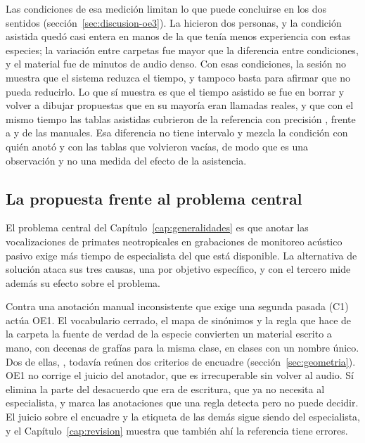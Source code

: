 Las condiciones de esa medición limitan lo que puede concluirse en los dos
sentidos (sección~\ref{sec:discusion-oe3}). La hicieron dos personas, y la
condición asistida quedó casi entera en manos de la que tenía menos experiencia
con estas especies; la variación entre carpetas fue mayor que la diferencia entre
condiciones, y el material fue de \uSessionMinutes{} minutos de audio denso. Con
esas condiciones, la sesión no muestra que el sistema reduzca el tiempo, y
tampoco basta para afirmar que no pueda reducirlo. Lo que sí muestra es que el
tiempo asistido se fue en borrar y volver a dibujar propuestas que en su mayoría
eran llamadas reales, y que con el mismo tiempo las tablas asistidas cubrieron
\uRecallAssisted{} de la referencia con precisión \uPrecisionAssisted{}, frente a
\uRecallManual{} y \uPrecisionManual{} de las manuales. Esa diferencia no tiene
intervalo y mezcla la condición con quién anotó y con las \uEmptyTables{} tablas
que volvieron vacías, de modo que es una observación y no una medida del efecto
de la asistencia.

\subsection{La propuesta frente al problema central}

El problema central del Capítulo~\ref{cap:generalidades} es que anotar las
vocalizaciones de primates neotropicales en grabaciones de monitoreo acústico
pasivo exige más tiempo de especialista del que está disponible. La alternativa
de solución ataca sus tres causas, una por objetivo específico, y con el tercero
mide además su efecto sobre el problema.

Contra una anotación manual inconsistente que exige una segunda pasada (C1)
actúa OE1. El
vocabulario cerrado, el mapa de sinónimos y la regla que hace de la carpeta la
fuente de verdad de la especie convierten un material escrito a mano, con decenas
de grafías para la misma clase, en \nClasses{} clases con un nombre único. Dos de
ellas, \splitShapes{}, todavía reúnen dos criterios de encuadre
(sección~\ref{sec:geometria}). OE1 no corrige el juicio del anotador, que es
irrecuperable sin volver al audio. Sí elimina la parte del desacuerdo que era de
escritura, que ya no necesita al especialista, y marca las \nReview{} anotaciones
que una regla detecta pero no puede decidir. El juicio sobre el encuadre y la
etiqueta de las demás sigue siendo del especialista, y el
Capítulo~\ref{cap:revision} muestra que también ahí la referencia tiene errores.

